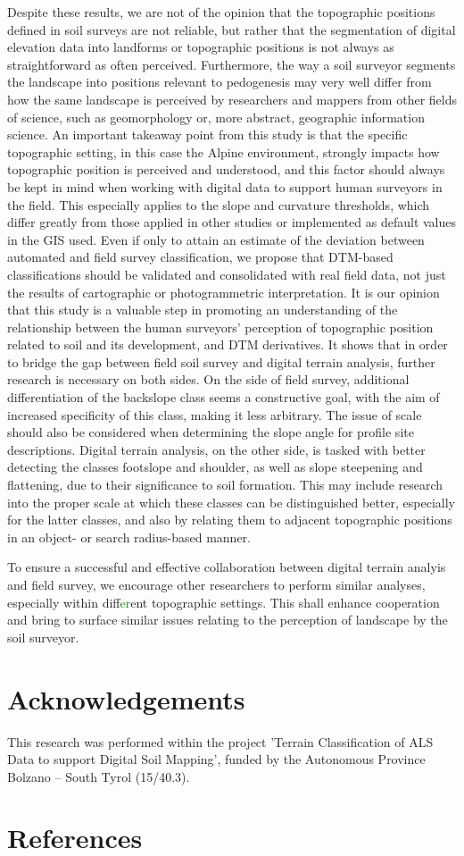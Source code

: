 \documentclass[preprint,12pt,authoryear]{elsarticle}
\begin{document}
Despite these results, we are not of the opinion that the topographic positions defined in  soil surveys are not reliable, but rather that the segmentation of digital elevation data into landforms or topographic positions is not always as straightforward as often perceived. Furthermore, the way a soil surveyor segments the landscape into positions relevant to pedogenesis may very well differ from how the same landscape is perceived by researchers and mappers from other fields of science, such as geomorphology or, more abstract, geographic information science. An important takeaway point from this study is that the specific topographic setting, in this case the Alpine environment, strongly impacts how topographic position is perceived and understood, and this factor should always be kept in mind when working with digital data to support human surveyors in the field. This especially applies to the slope and curvature thresholds, which differ greatly from those applied in other studies or implemented as default values in the GIS used. Even if only to attain an estimate of the deviation between automated and field survey classification, we propose that DTM-based classifications should be validated and consolidated with real field data, not just the results of cartographic or photogrammetric interpretation. It is our opinion that this study is a valuable step in promoting an understanding of the relationship between the human surveyors' perception of topographic position related to soil and its development, and DTM derivatives.
It shows that in order to bridge the gap between field soil survey and digital terrain analysis, further research is necessary on both sides. On the side of field survey, additional differentiation of the backslope class seems a constructive goal, with the aim of increased specificity of this class, making it less arbitrary. The issue of scale should also be considered when determining the slope angle for profile site descriptions. Digital terrain analysis, on the other side, is tasked with better detecting the classes footslope and shoulder, as well as slope steepening and flattening, due to their significance to soil formation. This may include research into the proper scale at which these classes can be distinguished better, especially for the latter classes, and also by relating them to adjacent topographic positions in an object- or search radius-based manner.

To ensure a successful and effective collaboration between digital terrain analyis and field survey, we encourage other researchers to perform similar analyses, especially within diff\textcolor{green}{er}ent topographic settings. This shall enhance cooperation and bring to surface similar issues relating to the perception of landscape by the soil surveyor.

\section*{Acknowledgements} This research was performed within the project 'Terrain Classification of ALS Data to support Digital Soil Mapping', funded by the Autonomous Province Bolzano -- South Tyrol (15/40.3).
\section*{References}

\end{document}
